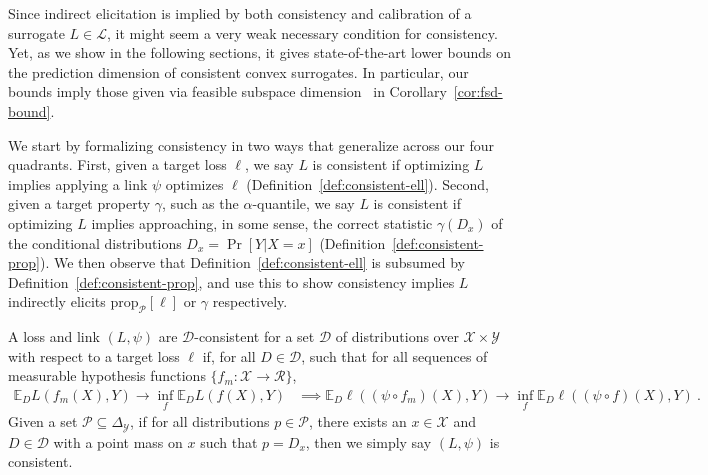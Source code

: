 \documentclass[anon,12pt]{colt2021} %
\newcommand{\Comments}{1}
\newcommand{\mytodo}[2]{\ifnum\Comments=1%
	\todo[linecolor=#1!80!black,backgroundcolor=#1,bordercolor=#1!80!black]{#2}\fi}
\newcommand{\raft}[1]{\mytodo{green!20!white}{RF: #1}}
\newcommand{\botodo}[1]{\mytodo{blue!20!white}{[Bo: #1]}}
\newcommand{\reals}{\mathbb{R}}
\newcommand{\simplex}{\Delta_\Y}
\newcommand{\prop}[2][\mathcal{P}]{\mathrm{prop}_{#1}[#2]}
\newcommand{\D}{\mathcal{D}}
\newcommand{\E}{\mathbb{E}}
\renewcommand{\L}{\mathcal{L}}
\newcommand{\R}{\mathcal{R}}
\renewcommand{\P}{\mathcal{P}}
\newcommand{\X}{\mathcal{X}}
\newcommand{\Y}{\mathcal{Y}}
\begin{document}
Since indirect elicitation is implied by both consistency and calibration of a surrogate $L \in \L$, it might seem a very weak necessary condition for consistency.
Yet, as we show in the following sections, it gives state-of-the-art lower bounds on the prediction dimension of consistent convex surrogates.
In particular, our bounds imply those given via feasible subspace dimension~\citep[Theorem 16]{ramaswamy2016convex} in Corollary~\ref{cor:fsd-bound}.

We start by formalizing consistency in two ways that generalize across our four quadrants.
First, given a target loss $\ell$, we say $L$ is consistent if optimizing $L$ implies applying a link $\psi$ optimizes $\ell$ (Definition~\ref{def:consistent-ell}).
Second, given a target property $\gamma$, such as the $\alpha$-quantile, we say $L$ is consistent if optimizing $L$ implies approaching, in some sense, the correct statistic $\gamma(D_x)$ of the conditional distributions $D_x = \Pr[Y|X=x]$ (Definition~\ref{def:consistent-prop}).
We then observe that Definition~\ref{def:consistent-ell} is subsumed by Definition~\ref{def:consistent-prop}, and use this to show consistency implies $L$ indirectly elicits $\prop{\ell}$ or $\gamma$ respectively.

\begin{definition}\label{def:consistent-ell}
	A loss and link $(L,\psi)$ are $\D$-consistent for a set $\D$ of distributions over $\X \times \Y$ with respect to a target loss $\ell$ if, for all $D \in \D$, such that for all sequences of measurable hypothesis functions $\{f_m : \X \to \R\}$,
	\begin{align*}
	\E_D L(f_m(X), Y) \to \inf_f \E_D L(f(X), Y) &\implies \E_D \ell((\psi \circ f_m)(X), Y) \to \inf_f \E_D \ell((\psi \circ f)(X), Y)~.~
	\end{align*}
Given a set $\P \subseteq \simplex$, if for all distributions $p \in \P$, there exists an $x \in \X$ and $D \in \D$ with a point mass on $x$ such that $p = D_x$, then we simply say $(L,\psi)$ is consistent.
\end{definition}


\end{document}

